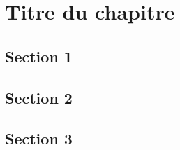 \chapter{Titre du chapitre}
\minitoc

\newpage
\section{Section 1}
\lipsum[1-1]
\section{Section 2}
\lipsum[1-1]
\section{Section 3}
\lipsum[1-1]